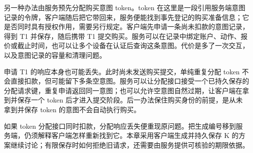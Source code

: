 

另一种办法由服务预先分配购买意图 token。token 在这里是一段引用服务端意图记录的令牌，客户端随后把它带回来，服务便能找到事先登记的购买准备信息；它是否同时具有授权作用，需要另行规定。客户端先申请一条尚未扣款的意图记录，得到 T1 并保存，随后携带 T1 提交购买。服务可以在记录中绑定账户、动作、报价或截止时间，也可以让多个设备在认证后查询这条意图。代价是多了一次交互，以及意图记录的容量和清理问题。

申请 T1 的响应本身也可能丢失。此时尚未发送购买提交，单纯重复分配 token 不会直接扣款，但可能留下多条空意图。服务可以让分配接口接受一个已持久保存的分配请求键，重复申请返回同一意图；也可以允许空意图自然过期，让客户端在拿到并保存一个 token 后才进入提交阶段。后一办法保住购买身份的前提，是从未拿到并保存 token 的意图不会自动执行购买。

如果 token 分配接口同时扣款，分配响应丢失便重现原问题。把生成编号移到服务端，仍须解释客户端怎样重新找到它。本章采用客户端生成并持久保存 K 的方案继续讨论；有限保存时如何拒绝旧请求，还需要由服务提供可核验的期限依据。
\FloatBarrier
